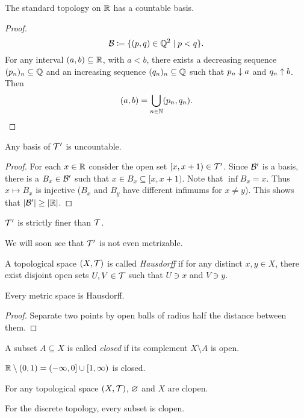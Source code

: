 
\begin{lemma}
    The standard topology on $\mathbb{R}$ has a countable basis.
\end{lemma}
\begin{proof}
    \[
        \mathcal{B} \coloneq \{(p, q) \in \mathbb{Q}^2 \mid p < q\}.
    \] For any interval $(a, b) \subseteq \mathbb{R}$, with $a < b$, there exists
    a decreasing sequence $(p_n)_n \subseteq \mathbb{Q}$ and an increasing sequence
    $(q_n)_n \subseteq \mathbb{Q}$ such that $p_n \downarrow a$ and $q_n \uparrow b$.
    Then \[
        (a, b) = \bigcup_{n \in \mathbb{N}} (p_n, q_n). \qedhere
    \]
\end{proof}

\begin{lemma}
    Any basis of $\mathcal{T}'$ is uncountable.
\end{lemma}
\begin{proof}
    For each $x \in \mathbb{R}$ consider the open set $[x, x + 1) \in \mathcal{T}'$.
    Since $\mathcal{B}'$ is a basis, there is a $B_x \in \mathcal{B}'$ such that
    $x \in B_x \subseteq [x, x + 1)$.
    Note that $\inf B_x = x$.
    Thus $x \mapsto B_x$ is injective ($B_x$ and $B_y$ have different
    infimums for $x \ne y$).
    This shows that $\lvert\mathcal{B}'\rvert \ge \lvert\mathbb{R}\rvert$.
\end{proof}
\begin{corollary}
    $\mathcal{T}'$ is strictly finer than $\mathcal{T}$.
\end{corollary}
We will soon see that $\mathcal{T}'$ is not even metrizable.

\begin{definition}[Hausdorff] \label{def:hausdorff}
    A topological space $(X, \mathcal{T})$ is called \emph{Hausdorff} if for
    any distinct $x, y \in X$, there exist disjoint open sets
    $U, V \in \mathcal{T}$ such that $U \ni x$ and $V \ni y$.
\end{definition}

\begin{lemma}
    Every metric space is Hausdorff.
\end{lemma}
\begin{proof}
    Separate two points by open balls of radius half the distance
    between them.
\end{proof}

\begin{definition}[closed] \label{def:closed}
    A subset $A \subseteq X$ is called \emph{closed} if its
    complement $X \setminus A$ is open.
\end{definition}
\begin{examples}
    \item $\mathbb{R} \setminus (0, 1) = (-\infty, 0] \cup [1, \infty)$ is closed.
    \item For any topological space $(X, \mathcal{T})$,
        $\varnothing$ and $X$ are clopen.
    \item For the discrete topology, every subset is clopen.
\end{examples}

